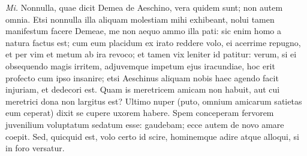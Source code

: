 {\textit{Mi.} Nonnulla, quae dicit Demea de Aeschino, vera quidem sunt; non autem omnia. Etsi nonnulla illa aliquam molestiam mihi exhibeant, nolui tamen manifestum facere Demeae, me non aequo ammo illa pati: sic enim homo a natura factus est; cum eum placidum ex irato reddere volo, ei acerrime repugno, et per vim et metum ab ira revoco; et tamen vix leniter id patitur: verum, si ei obsequendo magis irritem, adjuvemque impetum ejus iracundiae, hoc erit profecto cum ipso insanire; etsi Aeschinus aliquam nobis haec agendo facit injuriam, et dedecori est. Quam is meretricem amicam non habuit, aut cui meretrici dona non largitus est? Ultimo nuper (puto, omnium amicarum satietas eum ceperat) dixit se cupere uxorem habere. Spem conceperam fervorem juvenilium voluptatum sedatum esse: gaudebam; ecce autem de novo amare coepit. Sed, quicquid est, volo certo id scire, hominemque adire atque alloqui, si in foro versatur.

}
